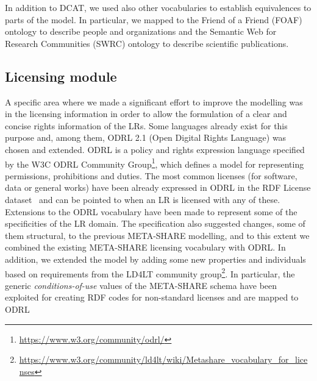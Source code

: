 \documentclass{llncs}
\begin{document}
In addition to DCAT, we used also other vocabularies to establish equivalences to parts of the model. In particular, we mapped to the Friend of
a Friend (FOAF) ontology to describe people and organizations and the Semantic
Web for Research Communities (SWRC) ontology to describe scientific
publications.

\subsection{Licensing module}
\label{sec:licensing}

A specific area where we made a significant effort to improve the modelling was
in the licensing information in order to allow the formulation of a clear and
concise rights information of the LRs. 
Some languages already exist for this purpose and, among them, ODRL 2.1 (Open Digital Rights Language) was
chosen and extended. ODRL is a policy and rights
expression language specified by the W3C ODRL Community
Group\footnote{\url{https://www.w3.org/community/odrl/}}, which defines a model
for representing permissions, prohibitions and duties.
The most common licenses (for software, data or general works) have been already
expressed in ODRL in the RDF License dataset~\cite{rdflicense} and can be pointed to when an LR is licensed with any of these.
Extensions to the ODRL vocabulary have been made to represent some of the specificities
of the LR domain. The specification also suggested changes, some of them
structural, to the previous META-SHARE modelling, and to this extent we
combined the existing META-SHARE licensing vocabulary with ODRL.
In addition, we extended the model by adding some new properties and individuals
based on requirements from the LD4LT community group\footnote{\url{https://www.w3.org/community/ld4lt/wiki/Metashare\_vocabulary\_for\_licenses}}.
In particular, the generic \textit{conditions-of-use} values of the META-SHARE schema have been exploited for
creating RDF codes for non-standard licenses and are mapped to ODRL
\end{document}
